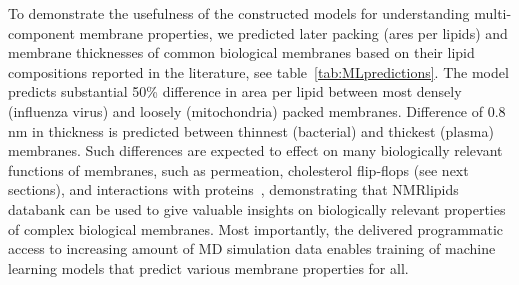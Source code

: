 \documentclass[fleqn,10pt]{wlscirep}
\begin{document}
To demonstrate the usefulness of the constructed models for understanding multi-component membrane properties, we predicted later packing (ares per lipids) and membrane thicknesses of common biological membranes based on their lipid compositions reported in the literature, see table~\ref{tab:MLpredictions}. The model predicts substantial 50\% difference in area per lipid between most densely (influenza virus) and loosely (mitochondria) packed membranes. Difference of 0.8\,nm in thickness is predicted between thinnest (bacterial) and thickest (plasma) membranes. Such differences are expected to effect on many biologically relevant functions of membranes, such as permeation, cholesterol flip-flops (see next sections), and interactions with proteins~\cite{phillips09}, demonstrating that NMRlipids databank can be used to give valuable insights on biologically relevant properties of complex biological membranes. Most importantly, the delivered programmatic access to increasing amount of MD simulation data enables training of machine learning models that predict various membrane properties for all.
\end{document}
